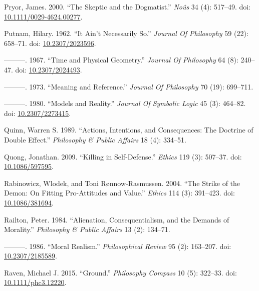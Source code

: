 \documentclass[
  10pt,
  letterpaper,
  DIV=11,
  numbers=noendperiod,
  twoside]{scrartcl}
\newlength{\cslhangindent}
\newenvironment{CSLReferences}[2] %
 {\begin{list}{}{%
  \setlength{\itemindent}{0pt}
  \setlength{\leftmargin}{0pt}
  \setlength{\parsep}{0pt}
  \ifodd #1
   \setlength{\leftmargin}{\cslhangindent}
   \setlength{\itemindent}{-1\cslhangindent}
  \fi
  \setlength{\itemsep}{#2\baselineskip}}}
 {\end{list}}
\begin{document}
\begin{CSLReferences}{1}{0}
Pryor, James. 2000. {``The Skeptic and the Dogmatist.''} \emph{Noûs} 34
(4): 517--49. doi:
\href{https://doi.org/10.1111/0029-4624.00277}{10.1111/0029-4624.00277}.

Putnam, Hilary. 1962. {``It Ain't Necessarily So.''} \emph{Journal Of
Philosophy} 59 (22): 658--71. doi:
\href{https://doi.org/10.2307/2023596}{10.2307/2023596}.

---------. 1967. {``Time and Physical Geometry.''} \emph{Journal Of
Philosophy} 64 (8): 240--47. doi:
\href{https://doi.org/10.2307/2024493}{10.2307/2024493}.

---------. 1973. {``Meaning and Reference.''} \emph{Journal Of
Philosophy} 70 (19): 699--711.

---------. 1980. {``Models and Reality.''} \emph{Journal Of Symbolic
Logic} 45 (3): 464--82. doi:
\href{https://doi.org/10.2307/2273415}{10.2307/2273415}.

Quinn, Warren S. 1989. {``Actions, Intentions, and Consequences: The
Doctrine of Double Effect.''} \emph{Philosophy \& Public Affairs} 18
(4): 334--51.

Quong, Jonathan. 2009. {``Killing in Self-Defense.''} \emph{Ethics} 119
(3): 507--37. doi:
\href{https://doi.org/10.1086/597595}{10.1086/597595}.

Rabinowicz, Wlodek, and Toni Rønnow‐Rasmussen. 2004. {``The Strike of
the Demon: On Fitting Pro-Attitudes and Value.''} \emph{Ethics} 114 (3):
391--423. doi: \href{https://doi.org/10.1086/381694}{10.1086/381694}.

Railton, Peter. 1984. {``Alienation, Consequentialism, and the Demands
of Morality.''} \emph{Philosophy \& Public Affairs} 13 (2): 134--71.

---------. 1986. {``Moral Realism.''} \emph{Philosophical Review} 95
(2): 163--207. doi:
\href{https://doi.org/10.2307/2185589}{10.2307/2185589}.

Raven, Michael J. 2015. {``Ground.''} \emph{Philosophy Compass} 10 (5):
322--33. doi:
\href{https://doi.org/10.1111/phc3.12220}{10.1111/phc3.12220}.


\end{CSLReferences}
\end{document}
